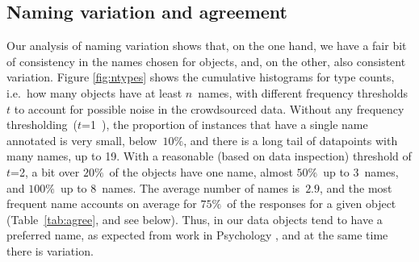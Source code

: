\subsection{Naming variation and agreement}
\label{subsec:counts}
Our analysis of naming variation shows that, on the one hand, we have a fair bit of consistency in the names chosen for objects, and, on the other, also consistent variation.
Figure \ref{fig:ntypes} shows the cumulative histograms for type counts, i.e.\ how many objects have at least $n$\ names, with different frequency thresholds~$t$ to account for possible noise in the crowdsourced data.
Without any frequency thresholding~\mbox{($t$=1 )}, the proportion of instances that have a single name annotated is very small, below\ $10\%$, and there is a long tail of datapoints with many names, up to 19. 
With a reasonable (based on data inspection) threshold of $t$=2, a bit over $20\%$\ of the objects have one name, almost $50\%$\ up to $3$\ names, and $100\%$\ up to $8$\ names.
The average number of names is\ $2.9$, and the most frequent name accounts on average for $75\%$\ of the responses for a given object (Table~\ref{tab:agree}, and see below).
Thus, in our data objects tend to have a preferred name, as expected from work in Psychology \cite{rosch1976basic,jolicoeur1984pictures}, and at the same time there is variation.

